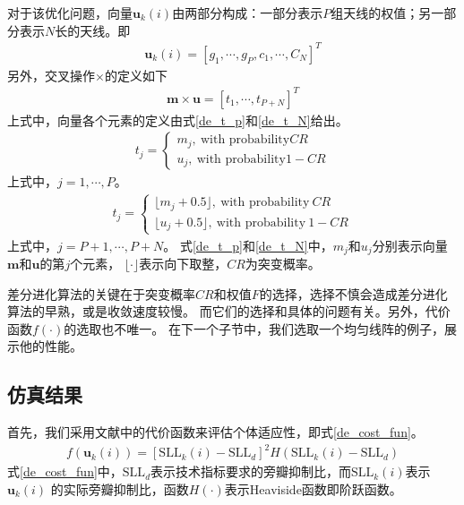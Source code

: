 \documentclass[master]{thesis-uestc}
\begin{document}
对于该优化问题，向量$\bm{u}_k(i)$由两部分构成：一部分表示$P$组天线的权值；另一部分表示$N$长的天线。即
\begin{equation}
    \begin{aligned}
        \bm{u}_k(i) = \left[g_1,\cdots,g_P,c_1,\cdots,C_N\right]^T
    \end{aligned}
\end{equation}
另外，交叉操作$\times$的定义如下
\begin{equation}
    \begin{aligned}
        \bm{m} \times \bm{u} = \left[t_1, \cdots, t_{P+N}\right]^T
    \end{aligned}
\end{equation}
上式中，向量各个元素的定义由式\eqref{de_t_p}和\eqref{de_t_N}给出。
\begin{equation}\label{de_t_p}
    \begin{aligned}
        t_j = 
        \begin{cases}
            m_j, ~ \text{with probability} CR \\
            u_j, ~ \text{with probability} 1 - CR
        \end{cases}
    \end{aligned}
\end{equation}
上式中，$j=1,\cdots,P$。
\begin{equation}\label{de_t_N}
    \begin{aligned}
        t_j = 
        \begin{cases}
            \lfloor m_j+0.5 \rfloor, ~ \text{with probability} ~ CR \\
            \lfloor u_j+0.5 \rfloor, ~ \text{with probability} ~ 1 - CR
        \end{cases}
    \end{aligned}
\end{equation}
上式中，$j=P+1,\cdots,P+N$。
式\eqref{de_t_p}和\eqref{de_t_N}中，$m_j$和$u_j$分别表示向量$\bm{m}$和$\bm{u}$的第$j$个元素，
$\lfloor\cdot\rfloor$表示向下取整，$CR$为突变概率。

差分进化算法的关键在于突变概率$CR$和权值$F$的选择，选择不慎会造成差分进化算法的早熟，或是收敛速度较慢。
而它们的选择和具体的问题有关。另外，代价函数$f(\cdot)$的选取也不唯一。
在下一个子节中，我们选取一个均匀线阵的例子，展示他的性能。

\subsection{仿真结果}
首先，我们采用文献\cite{Lopez_01}中的代价函数来评估个体适应性，即式\eqref{de_cost_fun}。
\begin{equation}\label{de_cost_fun}
    \begin{aligned}
        f(\bm{u}_k(i)) = \left[\text{SLL}_k(i)-\text{SLL}_d\right]^2 
        H\left(\text{SLL}_k(i)-\text{SLL}_d\right)
    \end{aligned}
\end{equation}
式\eqref{de_cost_fun}中，$\text{SLL}_d$表示技术指标要求的旁瓣抑制比，而$\text{SLL}_k(i)$表示$\bm{u}_k(i)$
的实际旁瓣抑制比，函数$H(\cdot)$表示Heaviside函数即阶跃函数。
\end{document}
